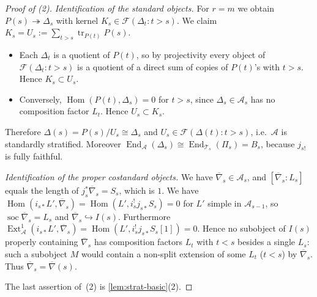\documentclass[11pt,reqno]{amsart}
\theoremstyle{plain}
\theoremstyle{definition}
\theoremstyle{remark}
\DeclareMathOperator{\Hom}{Hom}
\DeclareMathOperator{\End}{End}
\DeclareMathOperator{\Ext}{Ext}
\DeclareMathOperator{\soc}{soc}
\DeclareMathOperator{\tr}{tr}
\newcommand{\nablabar}{\overline{\nabla}}
\newcommand{\cA}{\mathcal{A}}
\newcommand{\cT}{\mathcal{T}}
\newcommand{\cF}{\mathcal{F}}
\begin{document}
\begin{proof}[Proof of \textup{(2)}]
\emph{Identification of the standard objects.} For $r=m$ we obtain $P(s)\twoheadrightarrow\Delta_s$ with kernel $K_s\in\cF(\Delta_t:t>s)$. We claim $K_s=U_s:=\sum_{t>s}\tr_{P(t)}P(s)$.
\begin{itemize}
\item Each $\Delta_t$ is a quotient of $P(t)$, so by projectivity every object of $\cF(\Delta_t:t>s)$ is a quotient of a direct sum of copies of $P(t)$'s with $t>s$. Hence $K_s\subset U_s$.
\item Conversely, $\Hom(P(t),\Delta_s)=0$ for $t>s$, since $\Delta_s\in\cA_s$ has no composition factor $L_t$. Hence $U_s\subset K_s$.
\end{itemize}
Therefore $\Delta(s)=P(s)/U_s\cong\Delta_s$ and $U_s\in\cF(\Delta(t):t>s)$, i.e.\ $\cA$ is standardly stratified. Moreover $\End_\cA(\Delta_s)\cong\End_{\cT_s}(\Pi_s)=B_s$, because $j_{s!}$ is fully faithful.

\emph{Identification of the proper costandard objects.} We have $\nablabar_s\in\cA_s$, and $[\nablabar_s:L_s]$ equals the length of $j_s^*\nablabar_s=S_s$, which is $1$. We have $\Hom(i_{s*}L',\nablabar_s)=\Hom(L',i_s^!j_{s*}S_s)=0$ for $L'$ simple in $\cA_{s-1}$, so $\soc\nablabar_s=L_s$ and $\nablabar_s\hookrightarrow I(s)$. Furthermore $\Ext^1_\cA(i_{s*}L',\nablabar_s)=\Hom(L',i_s^!j_{s*}S_s[1])=0$. Hence no subobject of $I(s)$ properly containing $\nablabar_s$ has composition factors $L_t$ with $t<s$ besides a single $L_s$: such a subobject $M$ would contain a non-split extension of some $L_t$ ($t<s$) by $\nablabar_s$. Thus $\nablabar_s=\nablabar(s)$.

The last assertion of~(2) is \cref{lem:strat-basic}(2).
\end{proof}
\end{document}
